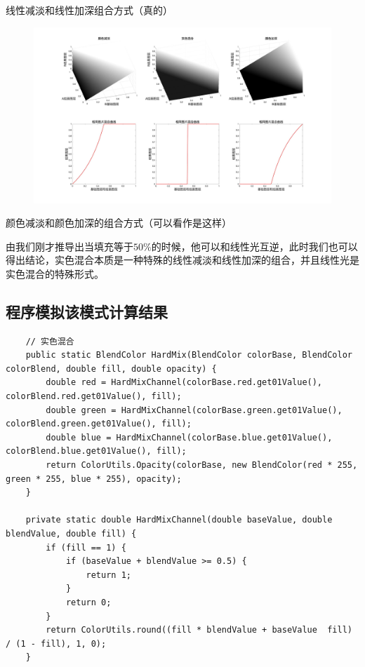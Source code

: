 线性减淡和线性加深组合方式（真的）
\begin{figure}[h!]
	\centering
	\includegraphics[width=\linewidth]{figure/试色颜色混合}
	\caption{}
	\label{fig:}
\end{figure}



颜色减淡和颜色加深的组合方式（可以看作是这样）


\begin{notice}
	\item 由我们刚才推导出当填充等于$50\%$的时候，他可以和线性光互逆，此时我们也可以得出结论，实色混合本质是一种特殊的线性减淡和线性加深的组合，并且线性光是实色混合的特殊形式。
\end{notice}
\subsection{ 程序模拟该模式计算结果}

\begin{lstlisting}
	// 实色混合
	public static BlendColor HardMix(BlendColor colorBase, BlendColor colorBlend, double fill, double opacity) {
		double red = HardMixChannel(colorBase.red.get01Value(), colorBlend.red.get01Value(), fill);
		double green = HardMixChannel(colorBase.green.get01Value(), colorBlend.green.get01Value(), fill);
		double blue = HardMixChannel(colorBase.blue.get01Value(), colorBlend.blue.get01Value(), fill);
		return ColorUtils.Opacity(colorBase, new BlendColor(red * 255, green * 255, blue * 255), opacity);
	}
	
	private static double HardMixChannel(double baseValue, double blendValue, double fill) {
		if (fill == 1) {
			if (baseValue + blendValue >= 0.5) {
				return 1;
			}
			return 0;
		}
		return ColorUtils.round((fill * blendValue + baseValue  fill) / (1 - fill), 1, 0);
	}
\end{lstlisting}



